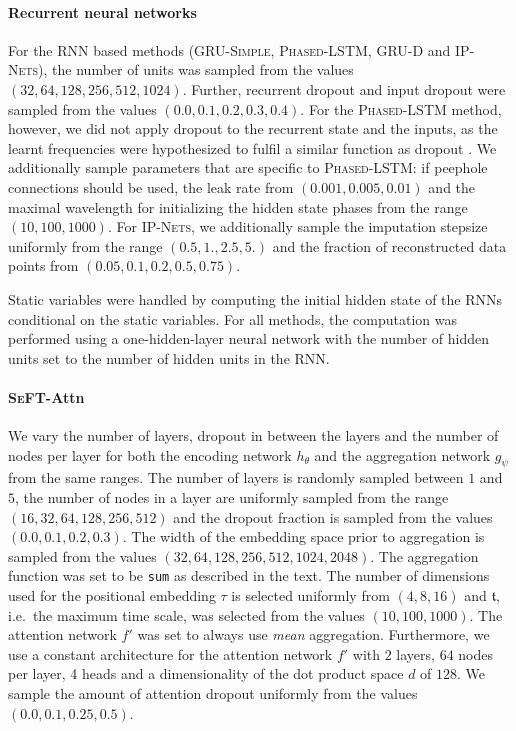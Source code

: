 \documentclass{article}
\newcommand{\methodname}     {\textsc{SeFT}\xspace}
\newcommand{\method}[1]{\textsc{#1}}
\begin{document}
\paragraph{Recurrent neural networks}
For the RNN based methods (\method{GRU-Simple}, \method{Phased-LSTM},
\method{GRU-D} and \method{IP-Nets}), the number of units was sampled
from the values $(32, 64, 128, 256, 512, 1024)$. Further, recurrent dropout
and input dropout were sampled from the values $(0.0, 0.1, 0.2, 0.3, 0.4)$.
For the \method{Phased-LSTM} method, however, we did not apply dropout to the
recurrent state and the inputs, as the learnt frequencies were hypothesized to
fulfil a similar function as dropout \citep{neil2016phased}.  We
additionally sample parameters that are specific to \method{Phased-LSTM}: if
peephole connections should be used, the leak rate from $(0.001, 0.005, 0.01)$
and the maximal wavelength for initializing the hidden state phases from the
range $(10, 100, 1000)$. For \method{IP-Nets}, we additionally sample the
imputation stepsize uniformly from the range $(0.5, 1., 2.5, 5.)$ and the
fraction of reconstructed data points from $(0.05, 0.1, 0.2, 0.5,
0.75)$.

Static variables were handled by computing the initial hidden state of
the RNNs conditional on the static variables. For all methods, the
computation was performed using a one-hidden-layer neural network with
the number of hidden units set to the number of hidden units in the RNN. 

\paragraph{\methodname-Attn}
We vary the number of layers, dropout in between the layers and the number of
nodes per layer for both the encoding network $h_\theta$ and the aggregation
network $g_\psi$ from the same ranges. The number of layers is randomly sampled
between $1$ and $5$, the number of nodes in a layer are uniformly sampled from
the range $(16, 32, 64, 128, 256, 512)$ and the dropout fraction is sampled
from the values $(0.0, 0.1, 0.2, 0.3)$. The width of the embedding space prior
to aggregation is sampled from the values $(32, 64, 128, 256, 512, 1024,
2048)$. The aggregation function was set to be \texttt{sum} as described in the text.
The number of dimensions used for the positional embedding $\tau$ is selected
uniformly from $(4, 8, 16)$ and $\mathfrak{t}$, i.e.\ the maximum
time scale, was selected from the values $(10, 100, 1000)$.
The attention network $f'$ was set to always use \emph{mean} aggregation. 
Furthermore, we use a constant architecture for the attention network
$f'$ with $2$ layers, $64$ nodes per layer, 4 heads and a dimensionality
of the dot product space $d$ of $128$. We sample the amount of attention
dropout uniformly from the values $(0.0, 0.1, 0.25, 0.5)$.
\end{document}

